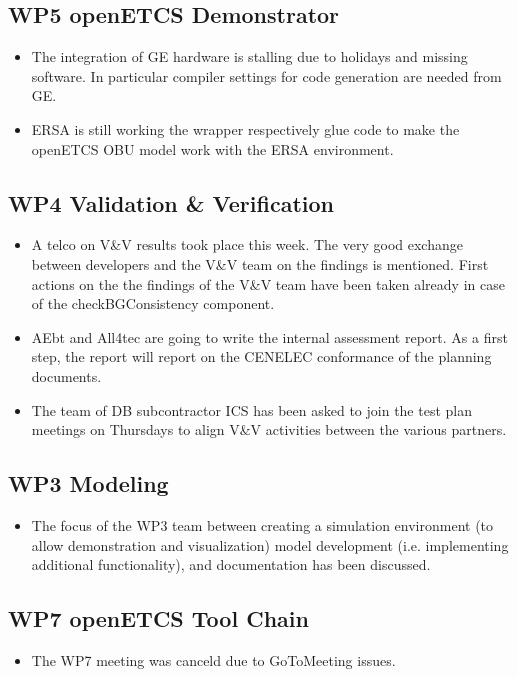 \documentclass[a4paper, 11pt]{article}
\begin{document}
\subsection{WP5 openETCS Demonstrator}
\begin{itemize}
\item The integration of GE hardware is stalling due to holidays and missing software. In particular compiler settings for code generation are needed from GE. 
\item ERSA is still working the wrapper respectively glue code  to make the openETCS OBU model work with the ERSA environment.
\end{itemize}

\subsection{WP4 Validation \& Verification}
\begin{itemize}
\item A telco on V\&V results took place this week. The very good exchange between developers and the V\&V team on the findings is mentioned. First actions on the the findings of the V\&V team have been taken already in case of the checkBGConsistency component.
\item AEbt and All4tec are going to write the internal assessment report. As a first step, the report will report on the CENELEC conformance of the planning documents.
\item The team of DB subcontractor ICS has been asked to join the test plan meetings on Thursdays to align V\&V activities between the various partners.
\end{itemize}

\subsection{WP3 Modeling}
\begin{itemize}
\item The focus of the WP3 team between creating a simulation environment (to allow demonstration and visualization) model development (i.e. implementing additional functionality), and documentation has been discussed.
\end{itemize}

\subsection{WP7 openETCS Tool Chain}
\begin{itemize}
\item The WP7 meeting was canceld due to GoToMeeting issues.
\end{itemize}
\end{document}
